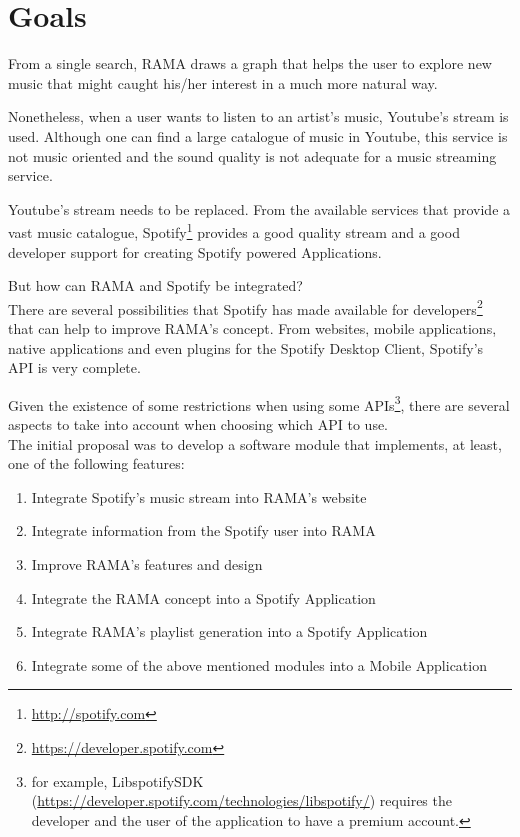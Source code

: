 \documentclass[twocolumn]{article}
\begin{document}
\section{Goals}
\label{sec:goals}

  From a single search, RAMA draws a graph that helps the user to explore new music that might caught his/her interest in a much more natural way.

  Nonetheless, when a user wants to listen to an artist's music, Youtube's stream is used.
  Although one can find a large catalogue of music in Youtube, this service is not music oriented and the sound quality is not adequate for a music streaming service.

  Youtube's stream needs to be replaced.
  From the available services that provide a vast music catalogue, Spotify\footnote{\url{http://spotify.com}} provides a good quality stream and a good developer support for creating Spotify powered Applications.

  But how can RAMA and Spotify be integrated? \\

  There are several possibilities that Spotify has made available for developers\footnote{\url{https://developer.spotify.com}} that can help to improve RAMA's concept.
  From websites, mobile applications, native applications and even plugins for the Spotify Desktop Client, Spotify's API is very complete.

  Given the existence of some restrictions when using some APIs\footnote{for example, LibspotifySDK (\url{https://developer.spotify.com/technologies/libspotify/}) requires the developer and the user of the application to have a premium account.}, there are several aspects to take into account when choosing which API to use. \\

  The initial proposal was to develop a software module that implements, at least, one of the following features:

  \begin{enumerate}
    \item \label{intro:obj1} Integrate Spotify's music stream into RAMA's website
    \item \label{intro:obj2} Integrate information from the Spotify user into RAMA
    \item \label{intro:obj3} Improve RAMA's features and design
    \item \label{intro:obj4} Integrate the RAMA concept into a Spotify Application
    \item \label{intro:obj5} Integrate RAMA's playlist generation into a Spotify Application
    \item \label{intro:obj6} Integrate some of the above mentioned modules into a Mobile Application
  \end{enumerate}
\end{document}
